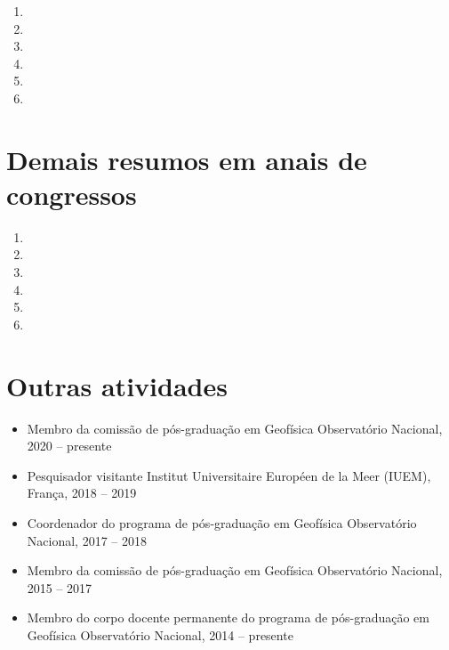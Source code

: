 \begin{enumerate}
	\item {}
	\item {}
	\item {}
	\item {}
	\item {}
	\item {}
\end{enumerate}

\section{Demais resumos em anais de congressos}

\begin{enumerate}
	\item {}
	\item {}
	\item {}
	\item {}
	\item {}
	\item {}
\end{enumerate}

\section{Outras atividades}

\begin{itemize}
	\item Membro da comissão de pós-graduação em Geofísica \newline
	Observat\'{o}rio Nacional, 2020 -- presente

	\item Pesquisador visitante \newline
	Institut Universitaire Européen de la Meer (IUEM), França, 2018 -- 2019 

	\item Coordenador do programa de pós-graduação em Geofísica \newline
	Observat\'{o}rio Nacional, 2017 -- 2018
	
	\item Membro da comissão de pós-graduação em Geofísica \newline
	Observat\'{o}rio Nacional, 2015 -- 2017
	
	\item Membro do corpo docente permanente do programa de pós-graduação em Geofísica \newline
	Observat\'{o}rio Nacional, 2014 -- presente
	
\end{itemize}